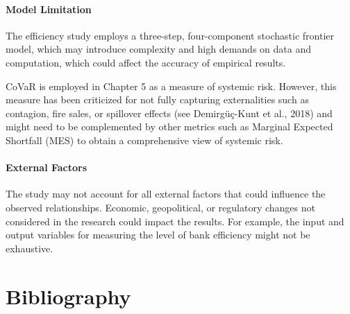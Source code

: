 \documentclass[
  12pt,
  a4paper,
]{scrreprt}
\begin{document}
\subsubsection{Model Limitation}\label{model-limitation}

The efficiency study employs a three-step, four-component stochastic
frontier model, which may introduce complexity and high demands on data
and computation, which could affect the accuracy of empirical results.

CoVaR is employed in Chapter 5 as a measure of systemic risk. However,
this measure has been criticized for not fully capturing externalities
such as contagion, fire sales, or spillover effects (see Demirgüç-Kunt
et al., 2018) and might need to be complemented by other metrics such as
Marginal Expected Shortfall (MES) to obtain a comprehensive view of
systemic risk.

\subsubsection{External Factors}\label{external-factors}

The study may not account for all external factors that could influence
the observed relationships. Economic, geopolitical, or regulatory
changes not considered in the research could impact the results. For
example, the input and output variables for measuring the level of bank
efficiency might not be exhaustive.


\chapter*{Bibliography}\label{bibliography}

\end{document}
